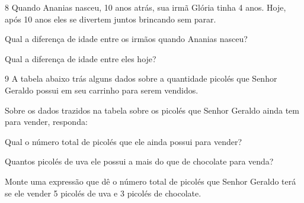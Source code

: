 

\num{8} Quando Ananias nasceu, 10 anos atrás, sua irmã Glória tinha 4 anos.
Hoje, após 10 anos eles se divertem juntos brincando sem parar.

\begin{escolha}
\item
  Qual a diferença de idade entre os irmãos quando Ananias nasceu?


\item
  Qual a diferença de idade entre eles hoje?

\end{escolha}


\num{9} A tabela abaixo trás alguns dados sobre a quantidade picolés que
Senhor Geraldo possui em seu carrinho para serem vendidos.


Sobre os dados trazidos na tabela sobre os picolés que Senhor Geraldo
ainda tem para vender, responda:

\begin{escolha}
\item
  Qual o número total de picolés que ele ainda possui para vender?


\item
  Quantos picolés de uva ele possui a mais do que de chocolate para
  venda?


\item
  Monte uma expressão que dê o número total de picolés que Senhor
  Geraldo terá se ele vender 5 picolés de uva e 3 picolés de chocolate.

\end{escolha}

